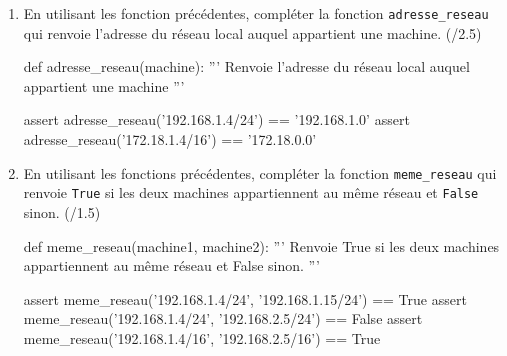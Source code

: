 \documentclass[a4paper,10pt]{report}
\begin{document}
   \begin{enumerate}[resume]
    \item En utilisant les fonction précédentes, compléter la fonction \verb|adresse_reseau| qui renvoie l'adresse du réseau local auquel appartient une machine. (/2.5)

   \begin{CodePythontexAlt}[TaillePolice=\large, Largeur=1\linewidth,Centre,Lignes=true,PremLigne=1]{}
def adresse_reseau(machine):
    ''' Renvoie l'adresse du réseau local auquel appartient une machine '''




















assert adresse_reseau('192.168.1.4/24') == '192.168.1.0'
assert adresse_reseau('172.18.1.4/16') == '172.18.0.0'
   \end{CodePythontexAlt}


   \item En utilisant les fonctions précédentes, compléter la fonction \verb|meme_reseau| qui renvoie \verb|True| si les deux machines appartiennent au même réseau et \verb|False| sinon. (/1.5)
   
   \begin{CodePythontexAlt}[TaillePolice=\large, Largeur=1\linewidth,Centre,Lignes=true,PremLigne=1]{}
def meme_reseau(machine1, machine2):
    ''' Renvoie True si les deux machines appartiennent au même réseau 
    et False sinon. '''
















assert meme_reseau('192.168.1.4/24', '192.168.1.15/24') == True
assert meme_reseau('192.168.1.4/24', '192.168.2.5/24') == False
assert meme_reseau('192.168.1.4/16', '192.168.2.5/16') == True

   \end{CodePythontexAlt}

      \end{enumerate}

    
\end{document}
